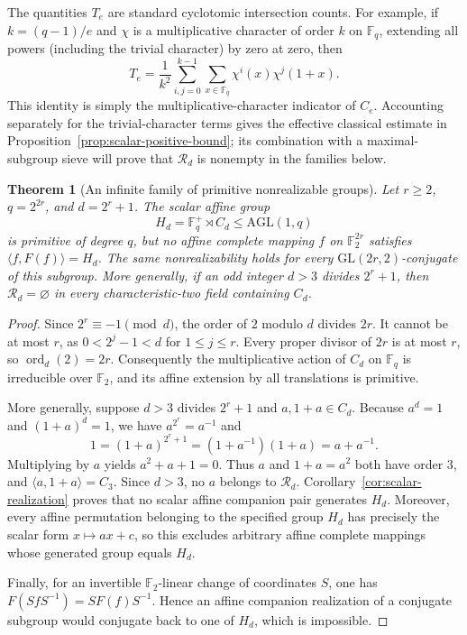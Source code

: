 \documentclass[11pt]{article}
\newtheorem{theorem}{Theorem}[section]
\begin{document}
The quantities $T_e$ are standard cyclotomic intersection counts.
For example, if $k=(q-1)/e$ and $\chi$ is a multiplicative
character of order $k$ on $\mathbb F_q$, extending all powers
(including the trivial character) by zero at zero, then
\[
T_e=\frac1{k^2}\sum_{i,j=0}^{k-1}
       \sum_{x\in\mathbb F_q}\chi^i(x)\chi^j(1+x).
\]
This identity is simply the multiplicative-character indicator
of $C_e$. Accounting separately for the trivial-character terms gives
the effective classical estimate in
Proposition~\ref{prop:scalar-positive-bound}; its combination with a
maximal-subgroup sieve will prove that $\mathcal R_d$ is nonempty
in the families below.

\begin{theorem}[An infinite family of primitive nonrealizable groups]
\label{thm:fermat-obstruction}
Let $r\ge2$, $q=2^{2r}$, and $d=2^r+1$. The scalar affine group
\[
H_d=\mathbb F_q^+\rtimes C_d\le\mathrm{AGL}(1,q)
\]
is primitive of degree $q$, but no affine complete mapping $f$
on $\mathbb F_2^{2r}$ satisfies
$\langle f,F(f)\rangle=H_d$.
The same nonrealizability holds for every
$\mathrm{GL}(2r,2)$-conjugate of this subgroup.
More generally, if an odd integer $d>3$ divides $2^r+1$,
then $\mathcal R_d=\varnothing$ in every characteristic-two
field containing $C_d$.
\end{theorem}
\begin{proof}
Since $2^r\equiv-1\pmod d$, the order of $2$ modulo $d$
divides $2r$. It cannot be at most $r$, as
$0<2^j-1<d$ for $1\le j\le r$.
Every proper divisor of $2r$ is at most $r$, so
$\operatorname{ord}_d(2)=2r$.
Consequently the multiplicative action of $C_d$ on
$\mathbb F_q$ is irreducible over $\mathbb F_2$, and
its affine extension by all translations is primitive.

More generally, suppose $d>3$ divides $2^r+1$ and
$a,1+a\in C_d$. Because $a^d=1$ and
$(1+a)^d=1$, we have $a^{2^r}=a^{-1}$ and
\[
1=(1+a)^{2^r+1}
  =(1+a^{-1})(1+a)=a+a^{-1}.
\]
Multiplying by $a$ yields $a^2+a+1=0$.
Thus $a$ and $1+a=a^2$ both have order $3$,
and $\langle a,1+a\rangle=C_3$.
Since $d>3$, no $a$ belongs to $\mathcal R_d$.
Corollary~\ref{cor:scalar-realization} proves that no scalar
affine companion pair generates $H_d$. Moreover, every affine
permutation belonging to the specified group $H_d$ has precisely
the scalar form $x\mapsto ax+c$, so this excludes arbitrary
affine complete mappings whose generated group equals $H_d$.

Finally, for an invertible $\mathbb F_2$-linear change of
coordinates $S$, one has
$F(SfS^{-1})=SF(f)S^{-1}$. Hence an affine
companion realization of a conjugate subgroup would conjugate
back to one of $H_d$, which is impossible.
\end{proof}
\end{document}
